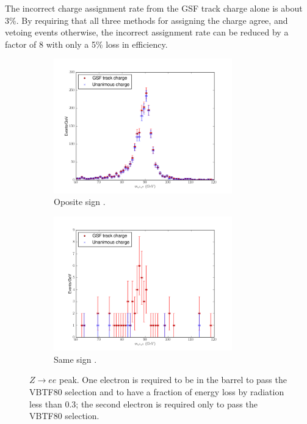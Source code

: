 The incorrect charge assignment rate from the GSF track charge alone is about
\unit{3}{\%}.  By requiring that all three methods for assigning the charge
agree, and vetoing events otherwise, the incorrect assignment rate can be
reduced by a factor of 8 with only a \unit{5}{\%} loss in efficiency.

\begin{figure}[htbp]
  \centering
  \begin{subfigure}{\textwidth}
    \centering
    \includegraphics[width=0.85\textwidth]{zpeak_os}
    \caption{Oposite sign \PZ.}
    \label{fig:zpeak_os}
  \end{subfigure}
  \begin{subfigure}{\textwidth}
    \centering
    \includegraphics[width=0.85\textwidth]{zpeak_ss}
    \caption{Same sign \PZ.}
    \label{fig:zpeak_ss}
  \end{subfigure}
  \caption{ $Z\rightarrow ee$ peak. One electron is required to be in the
barrel to pass the VBTF80 selection and to have a fraction of energy loss by
radiation less than 0.3; the second electron is required only to pass the VBTF80
selection.}\label{fig:zpeak} 
\end{figure}

